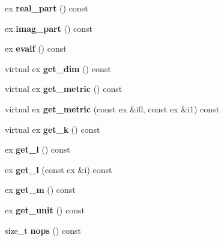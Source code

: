 \begin{DoxyCompactItemize}
ex {\bfseries real\+\_\+part} () const
\item 
\mbox{\label{class_moeb_inv_1_1cycle_a0e001540ce76a2f5ce0c3d478707418d}} 
ex {\bfseries imag\+\_\+part} () const
\item 
\mbox{\label{class_moeb_inv_1_1cycle_a547aecb94160c0ef85b30c7b719f2ad6}} 
ex {\bfseries evalf} () const
\item 
\mbox{\label{class_moeb_inv_1_1cycle_a614bac5413f4735163f62f1672a0bbef}} 
virtual ex {\bfseries get\+\_\+dim} () const
\item 
\mbox{\label{class_moeb_inv_1_1cycle_a83acb7139250e6e1d49383bb7b6ed30e}} 
virtual ex {\bfseries get\+\_\+metric} () const
\item 
\mbox{\label{class_moeb_inv_1_1cycle_a5ca174c8add86dee778aa70aa17b96d9}} 
virtual ex {\bfseries get\+\_\+metric} (const ex \&i0, const ex \&i1) const
\item 
\mbox{\label{class_moeb_inv_1_1cycle_afe1769e605e165bee92339b8a66b1351}} 
virtual ex {\bfseries get\+\_\+k} () const
\item 
\mbox{\label{class_moeb_inv_1_1cycle_a27df07a8034f526ef074ccdc4d3c388e}} 
ex {\bfseries get\+\_\+l} () const
\item 
\mbox{\label{class_moeb_inv_1_1cycle_ae594b2b25786e698709db27d86b2fbac}} 
ex {\bfseries get\+\_\+l} (const ex \&i) const
\item 
\mbox{\label{class_moeb_inv_1_1cycle_adfae0aacbda0df692a0d0d3c65943c0c}} 
ex {\bfseries get\+\_\+m} () const
\item 
\mbox{\label{class_moeb_inv_1_1cycle_a1f8a47a6a3eb3aff0fe9c845d6648d3f}} 
ex {\bfseries get\+\_\+unit} () const
\item 
\mbox{\label{class_moeb_inv_1_1cycle_ab8ebee0c26462d69e3e4da298d685184}} 
size\+\_\+t {\bfseries nops} () const

\end{DoxyCompactItemize}
